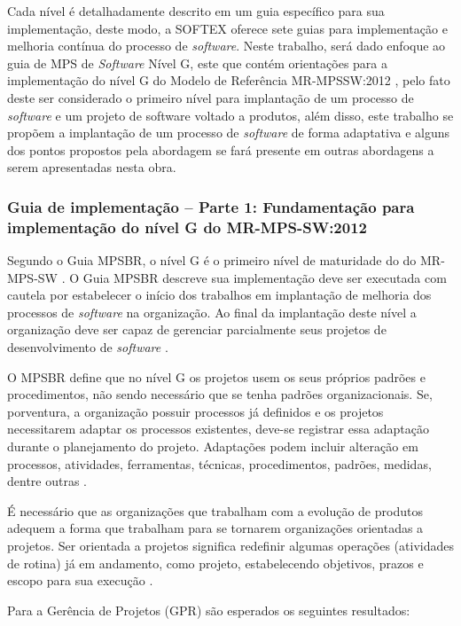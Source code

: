 \documentclass{acm_proc_article-sp}
\begin{document}
Cada nível é detalhadamente descrito em um guia específico para sua implementação, deste modo, a SOFTEX oferece sete guias para implementação e melhoria contínua do processo de \textit{software}. Neste trabalho, será dado enfoque ao guia de MPS de \textit{Software} Nível G, este que contém orientações para a implementação do nível G do Modelo de Referência MR-MPSSW:2012  \cite{mpsbr:nAgil}, pelo fato deste ser considerado o primeiro nível para implantação de um processo de \textit{software} e um projeto de software voltado a produtos, além disso, este trabalho se propõem a implantação de um processo de \textit{software} de forma adaptativa e alguns dos pontos propostos pela abordagem se fará presente em outras abordagens a serem apresentadas nesta obra.  

\subsubsection*{Guia de implementação – Parte 1: Fundamentação para implementação do nível G do MR-MPS-SW:2012}
Segundo o Guia MPSBR, o nível G é o primeiro nível de maturidade do do MR-MPS-SW \cite{mpsbr:nAgil}. O Guia MPSBR descreve sua implementação deve ser executada com cautela por estabelecer o início dos trabalhos em implantação de melhoria dos processos de \textit{software} na organização. Ao final da implantação deste nível a organização deve ser capaz de gerenciar parcialmente seus projetos de desenvolvimento de \textit{software} \cite{mpsbr:nAgil}.

O MPSBR define que no nível G os projetos usem os seus próprios padrões e procedimentos, não
sendo necessário que se tenha padrões organizacionais. Se, porventura, a organização possuir processos já definidos e os projetos necessitarem adaptar os processos existentes, deve-se registrar essa adaptação durante o planejamento do projeto. Adaptações podem incluir alteração em processos, atividades, ferramentas, técnicas, procedimentos, padrões, medidas, dentre outras \cite{mpsbr:nAgil}.

É necessário que as organizações que trabalham com a evolução de produtos adequem a forma que trabalham para se tornarem organizações orientadas a projetos. Ser orientada a projetos significa redefinir algumas operações (atividades
de rotina) já em andamento, como projeto, estabelecendo objetivos, prazos e escopo
para sua execução \cite{mpsbr:nAgil}.

Para a Gerência de Projetos (GPR) são esperados os seguintes resultados:
\end{document}
